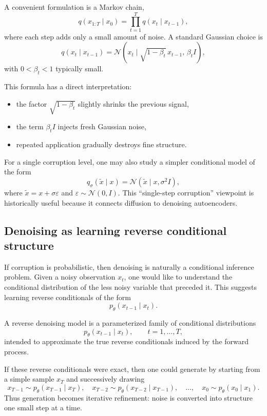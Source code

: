 A convenient formulation is a Markov chain,
\[
q(x_{1:T}\mid x_0)=\prod_{t=1}^T q(x_t\mid x_{t-1}),
\]
where each step adds only a small amount of noise.
A standard Gaussian choice is
\[
q(x_t\mid x_{t-1})=
\mathcal{N}\!\left(x_t\mid \sqrt{1-\beta_t}\,x_{t-1},\, \beta_t I\right),
\]
with $0<\beta_t<1$ typically small.

\medskip

This formula has a direct interpretation:
\begin{itemize}
    \item the factor $\sqrt{1-\beta_t}$ slightly shrinks the previous signal,
    \item the term $\beta_t I$ injects fresh Gaussian noise,
    \item repeated application gradually destroys fine structure.
\end{itemize}

For a single corruption level, one may also study a simpler conditional model of the form
\[
q_\sigma(\tilde x\mid x)=\mathcal{N}(\tilde x\mid x,\sigma^2 I),
\]
where $\tilde x=x+\sigma\varepsilon$ and $\varepsilon\sim \mathcal{N}(0,I)$.
This ``single-step corruption'' viewpoint is historically useful because it connects diffusion to denoising autoencoders.

\subsection*{Denoising as learning reverse conditional structure}

If corruption is probabilistic, then denoising is naturally a conditional inference problem.
Given a noisy observation $x_t$, one would like to understand the conditional distribution of the less noisy variable that preceded it.
This suggests learning reverse conditionals of the form
\[
p_\theta(x_{t-1}\mid x_t).
\]

\begin{definition}
A reverse denoising model is a parameterized family of conditional distributions
\[
p_\theta(x_{t-1}\mid x_t),\qquad t=1,\dots,T,
\]
intended to approximate the true reverse conditionals induced by the forward process.
\end{definition}

If these reverse conditionals were exact, then one could generate by starting from a simple sample $x_T$ and successively drawing
\[
x_{T-1}\sim p_\theta(x_{T-1}\mid x_T),\quad
x_{T-2}\sim p_\theta(x_{T-2}\mid x_{T-1}),\quad \dots,\quad
x_0\sim p_\theta(x_0\mid x_1).
\]
Thus generation becomes iterative refinement:
noise is converted into structure one small step at a time.

